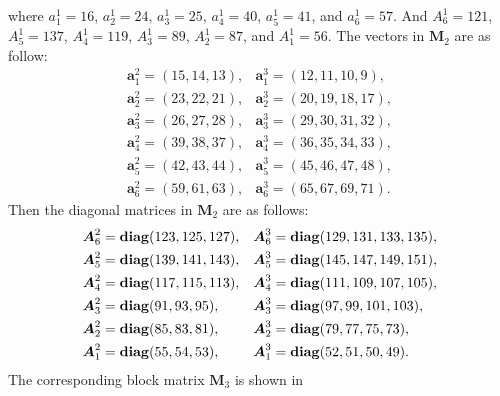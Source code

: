 \documentclass[12pt]{article}
\begin{document}
where $a_{1}^{1}=16$, $a_{2}^{1}=24$, $a_{3}^{1}=25$, $a_{4}^{1}=40$, $a_{5}^{1}=41$, and $a_{6}^{1}=57$. And ${A}_{6}^{1}=121$, ${A}_{5}^{1}=137$, ${A}_{4}^{1}=119$, ${A}_{3}^{1}=89$, ${A}_{2}^{1}=87$, and ${A}_{1}^{1}=56$. The vectors in $\boldsymbol{M}_{2}$ are as follow:
\begin{equation*}
\begin{array}{ll}
\boldsymbol{a}_{1}^{2}=(15,14,13), 
&\boldsymbol{a}_{1}^{3}=(12,11,10,9),\\[4pt]
\boldsymbol{a}_{2}^{2}=(23,22,21), 
&\boldsymbol{a}_{2}^{3}=(20,19,18,17),\\[4pt]
\boldsymbol{a}_{3}^{2}=(26,27,28), 
&\boldsymbol{a}_{3}^{3}=(29,30,31,32),\\[4pt]
\boldsymbol{a}_{4}^{2}=(39,38,37), 
&\boldsymbol{a}_{4}^{3}=(36,35,34,33),\\[4pt]
\boldsymbol{a}_{5}^{2}=(42,43,44), 
&\boldsymbol{a}_{5}^{3}=(45,46,47,48),\\[4pt]
\boldsymbol{a}_{6}^{2}=(59,61,63), 
&\boldsymbol{a}_{6}^{3}=(65,67,69,71).
\end{array}
\end{equation*}
Then the diagonal matrices in $\boldsymbol{M}_{2}$ are as follows:
\begin{equation*}
	\begin{array}{ll}
		\boldsymbol{A}_{6}^{2}={\rm\bf diag}(123,125,127), 
		&\boldsymbol{A}_{6}^{3}={\rm\bf diag}(129,131,133,135),\\[4pt]
		\boldsymbol{A}_{5}^{2}={\rm\bf diag}(139,141,143), 
		&\boldsymbol{A}_{5}^{3}={\rm\bf diag}(145,147,149,151),\\[4pt]
		\boldsymbol{A}_{4}^{2}={\rm\bf diag}(117,115,113), 
		&\boldsymbol{A}_{4}^{3}={\rm\bf diag}(111,109,107,105),\\[4pt]
		\boldsymbol{A}_{3}^{2}={\rm\bf diag}(91,93,95), 
		&\boldsymbol{A}_{3}^{3}={\rm\bf diag}(97,99,101,103),\\[4pt]
		\boldsymbol{A}_{2}^{2}={\rm\bf diag}(85,83,81), 
		&\boldsymbol{A}_{2}^{3}={\rm\bf diag}(79,77,75,73),\\[4pt]
		\boldsymbol{A}_{1}^{2}={\rm\bf diag}(55,54,53), 
		&\boldsymbol{A}_{1}^{3}={\rm\bf diag}(52,51,50,49).
	\end{array}
\end{equation*}
The corresponding block matrix $\boldsymbol{M}_{3}$ is shown in
\end{document}
